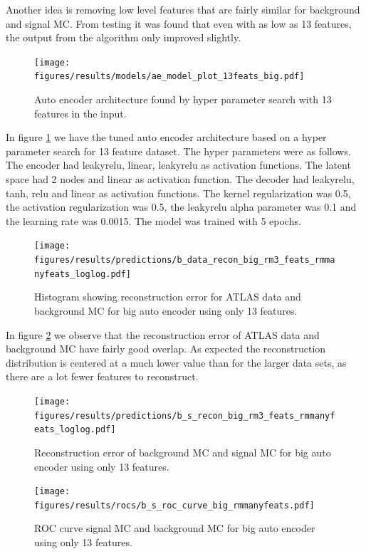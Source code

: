 \documentclass[ reprint, amsmath,amssymb, aps, nofootinbib]{revtex4-2}
\begin{document}
Another idea is removing low level features that are fairly similar for background and signal MC. From testing it was found that even with as low as 13 features, the output from the algorithm only improved slightly.



\begin{figure}[H]    
  \centering
         \texttt{[image: figures/results/models/ae\_model\_plot\_13feats\_big.pdf]}
         \caption{Auto encoder architecture found by hyper parameter search with 13 features in the input.}
         \label{fig:ae_13feats_big}  
  
\end{figure}

In figure \ref{fig:ae_13feats_big} we have the tuned auto encoder architecture based on a hyper parameter search for 13 feature dataset. The hyper parameters were as follows. The encoder had leakyrelu, linear, leakyrelu as activation functions. The latent space had 2 nodes and linear as activation function. The decoder had leakyrelu, tanh, relu and linear as activation functions. The kernel regularization was 0.5, the activation regularization was 0.5, the leakyrelu alpha parameter was 0.1 and the learning rate was 0.0015. The model was trained with 5 epochs.

\begin{figure}[H]
     \centering
         \texttt{[image: figures/results/predictions/b\_data\_recon\_big\_rm3\_feats\_rmmanyfeats\_loglog.pdf]}
         \caption{Histogram showing reconstruction error for ATLAS data and background MC for big auto encoder using only 13 features.}
     \label{fig:data_b_big_pred_13feats}
\end{figure}

In figure \ref{fig:data_b_big_pred_13feats} we observe that the reconstruction error of ATLAS data and background MC have fairly good overlap. As expected the reconstruction distribution is centered at a much lower value than for the larger data sets, as there are a lot fewer features to reconstruct. 

\begin{figure}[H]
    \centering
    \texttt{[image: figures/results/predictions/b\_s\_recon\_big\_rm3\_feats\_rmmanyfeats\_loglog.pdf]}
    \caption{Reconstruction error of background MC and signal MC for big auto encoder using only 13 features. }
    \label{fig:roc_sig_big_13feats}
\end{figure}

\begin{figure}[H]
    \centering
         \texttt{[image: figures/results/rocs/b\_s\_roc\_curve\_big\_rmmanyfeats.pdf]}
         \caption{ROC curve signal MC and background MC for big auto encoder using only 13 features.}
         \label{fig:s_b_big_roc_13}
\end{figure}
\end{document}
